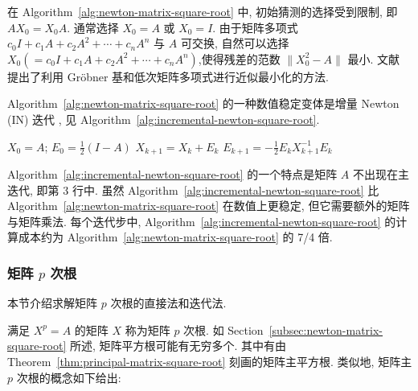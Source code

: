 {在 Algorithm~\ref{alg:newton-matrix-square-root} 中, 初始猜测的选择受到限制, 即 $AX_0=X_0A$. 通常选择 $X_0=A$ 或 $X_0=I$. 由于矩阵多项式 $c_0I+c_1A+c_2A^2+\cdots+c_nA^n$ 与 $A$ 可交换, 自然可以选择\newline{}$X_0(=c_0I+c_1A+c_2A^2+\cdots+c_nA^n)$,\newline{}使得残差的范数 $\|X_0^2-A\|$ 最小. 文献  提出了利用 Gröbner 基和低次矩阵多项式进行近似最小化的方法.}

{Algorithm~\ref{alg:newton-matrix-square-root} 的一种数值稳定变体是增量 Newton (IN) 迭代 , 见 Algorithm~\ref{alg:incremental-newton-square-root}.}

\begin{algorithm}[H]\caption{{(迭代法) 求 $X=A^{1/2}$ 的 IN 方法}}\label{alg:incremental-newton-square-root}\begin{algorithmic}[1]
\State $X_0=A$; $E_0=\frac{1}{2}(I-A)$
\State $X_{k+1}=X_k+E_k$
\State $E_{k+1}=-\frac{1}{2}E_kX_{k+1}^{-1}E_k$
\EndFor
\end{algorithmic}\end{algorithm}

{Algorithm~\ref{alg:incremental-newton-square-root} 的一个特点是矩阵 $A$ 不出现在主迭代, 即第 3 行中. 虽然 Algorithm~\ref{alg:incremental-newton-square-root} 比 Algorithm~\ref{alg:newton-matrix-square-root} 在数值上更稳定, 但它需要额外的矩阵与矩阵乘法. 每个迭代步中, Algorithm~\ref{alg:incremental-newton-square-root} 的计算成本约为 Algorithm~\ref{alg:newton-matrix-square-root} 的 7/4 倍.}

\subsubsection{{矩阵 $p$ 次根}}\label{subsec:matrix-pth-root}\label{srcpage:printed-197}

{本节介绍求解矩阵 $p$ 次根的直接法和迭代法.}

{满足 $X^p=A$ 的矩阵 $X$ 称为矩阵 $p$ 次根. 如 Section~\ref{subsec:newton-matrix-square-root} 所述, 矩阵平方根可能有无穷多个. 其中有由 Theorem~\ref{thm:principal-matrix-square-root} 刻画的矩阵主平方根. 类似地, 矩阵主 $p$ 次根的概念如下给出:}


